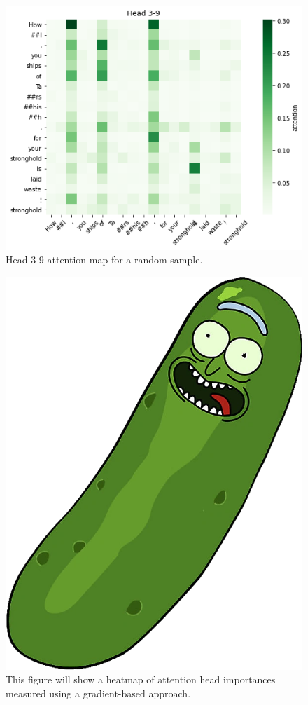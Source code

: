 \documentclass{dcthesis}
\theoremstyle{definition}
\theoremstyle{remark}
\begin{document}
\begin{figure}
  \centering
  \includegraphics[scale=0.8]{head_3-9.png}
  \captionsetup{justification=centering}
  \caption{\label{fig:head_3-9} Head 3-9 attention map for a random sample.}
\end{figure}

\begin{figure}
  \centering
  \includegraphics[scale=0.1]{images/pickle.png}
  \captionsetup{justification=centering}
  \caption{\label{fig:attn_feature_importances} This figure will show a heatmap of attention head importances measured using a gradient-based approach.}
\end{figure}
\end{document}

